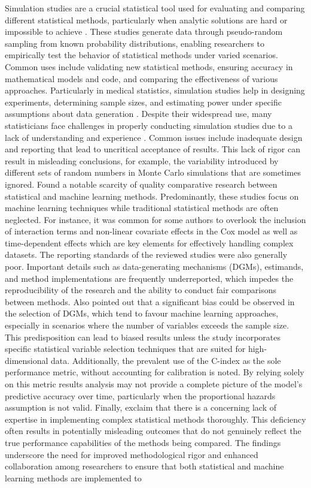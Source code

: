 \noindent Simulation studies are a crucial statistical tool used for evaluating and comparing different statistical methods, particularly when analytic solutions are hard or impossible to achieve \parencite{morris_using_2019}. These studies generate data through pseudo-random sampling from known probability distributions, enabling researchers to empirically test the behavior of statistical methods under varied scenarios. Common uses include validating new statistical methods, ensuring accuracy in mathematical models and code, and comparing the effectiveness of various approaches. Particularly in medical statistics, simulation studies help in designing experiments, determining sample sizes, and estimating power under specific assumptions about data generation \parencite{morris_using_2019}. Despite their widespread use, many statisticians face challenges in properly conducting simulation studies due to a lack of understanding and experience \parencite{morris_using_2019}. Common issues include inadequate design and reporting that lead to uncritical acceptance of results. This lack of rigor can result in misleading conclusions, for example, the variability introduced by different sets of random numbers in Monte Carlo simulations that are sometimes ignored. \parencite{smith_scoping_2022} Found a notable scarcity of quality comparative research between statistical and machine learning methods. Predominantly, these studies focus on machine learning techniques while traditional statistical methods are often neglected. For instance, it was common for some authors to overlook the inclusion of interaction terms and non-linear covariate effects in the Cox model as well as time-dependent effects which are key elements for effectively handling complex datasets. The reporting standards of the reviewed studies were also generally poor. Important details such as data-generating mechanisms (DGMs), estimands, and method implementations are frequently underreported, which impedes the reproducibility of the research and the ability to conduct fair comparisons between methods. \parencite{smith_scoping_2022} Also pointed out that a significant bias could be observed in the selection of DGMs, which tend to favour machine learning approaches, especially in scenarios where the number of variables exceeds the sample size. This predisposition can lead to biased results unless the study incorporates specific statistical variable selection techniques that are suited for high-dimensional data. Additionally, the prevalent use of the C-index as the sole performance metric, without accounting for calibration is noted. By relying solely on this metric results analysis may not provide a complete picture of the model's predictive accuracy over time, particularly when the proportional hazards assumption is not valid. Finally, \parencite{smith_scoping_2022} exclaim that there is a concerning lack of expertise in implementing complex statistical methods thoroughly. This deficiency often results in potentially misleading outcomes that do not genuinely reflect the true performance capabilities of the methods being compared. The findings underscore the need for improved methodological rigor and enhanced collaboration among researchers to ensure that both statistical and machine learning methods are implemented to 